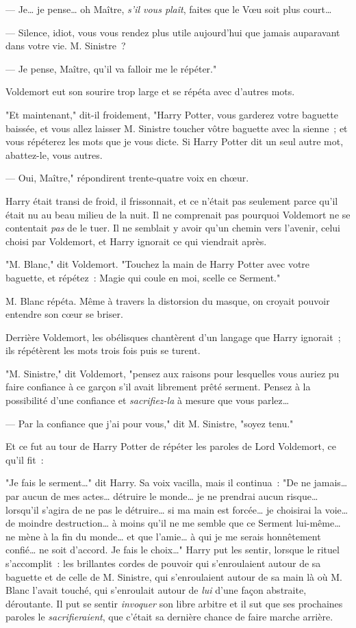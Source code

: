 --- Je… je pense… oh Maître, \emph{s'il vous plaît}, faites que le Vœu soit plus court…

--- Silence, idiot, vous vous rendez plus utile aujourd'hui que jamais auparavant dans votre vie. M. Sinistre~?

--- Je pense, Maître, qu'il va falloir me le répéter."

Voldemort eut son sourire trop large et se répéta avec d'autres mots.

"Et maintenant," dit-il froidement, "Harry Potter, vous garderez votre baguette baissée, et vous allez laisser M. Sinistre toucher vôtre baguette avec la sienne~; et vous répéterez les mots que je vous dicte. Si Harry Potter dit un seul autre mot, abattez-le, vous autres.

--- Oui, Maître," répondirent trente-quatre voix en chœur.

Harry était transi de froid, il frissonnait, et ce n'était pas seulement parce qu'il était nu au beau milieu de la nuit. Il ne comprenait pas pourquoi Voldemort ne se contentait \emph{pas} de le tuer. Il ne semblait y avoir qu'un chemin vers l'avenir, celui choisi par Voldemort, et Harry ignorait ce qui viendrait après.

"M. Blanc," dit Voldemort. "Touchez la main de Harry Potter avec votre baguette, et répétez~: Magie qui coule en moi, scelle ce Serment."

M. Blanc répéta. Même à travers la distorsion du masque, on croyait pouvoir entendre son cœur se briser.

Derrière Voldemort, les obélisques chantèrent d'un langage que Harry ignorait~; ils répétèrent les mots trois fois puis se turent.

"M. Sinistre," dit Voldemort, "pensez aux raisons pour lesquelles vous auriez pu faire confiance à ce garçon s'il avait librement prêté serment. Pensez à la possibilité d'une confiance et \emph{sacrifiez-la} à mesure que vous parlez…

--- Par la confiance que j'ai pour vous," dit M. Sinistre, "soyez tenu."

Et ce fut au tour de Harry Potter de répéter les paroles de Lord Voldemort, ce qu'il fit~:

"Je fais le serment…" dit Harry. Sa voix vacilla, mais il continua~: "De ne jamais… par aucun de mes actes… détruire le monde… je ne prendrai aucun risque… lorsqu'il s'agira de ne pas le détruire… si ma main est forcée… je choisirai la voie… de moindre destruction… à moins qu'il ne me semble que ce Serment lui-même… ne mène à la fin du monde… et que l'amie… à qui je me serais honnêtement confié… ne soit d'accord. Je fais le choix…" Harry put les sentir, lorsque le rituel s'accomplit~: les brillantes cordes de pouvoir qui s'enroulaient autour de sa baguette et de celle de M. Sinistre, qui s'enroulaient autour de sa main là où M. Blanc l'avait touché, qui s'enroulait autour de \emph{lui} d'une façon abstraite, déroutante. Il put se sentir \emph{invoquer} son libre arbitre et il sut que ses prochaines paroles le \emph{sacrifieraient}, que c'était sa dernière chance de faire marche arrière.

